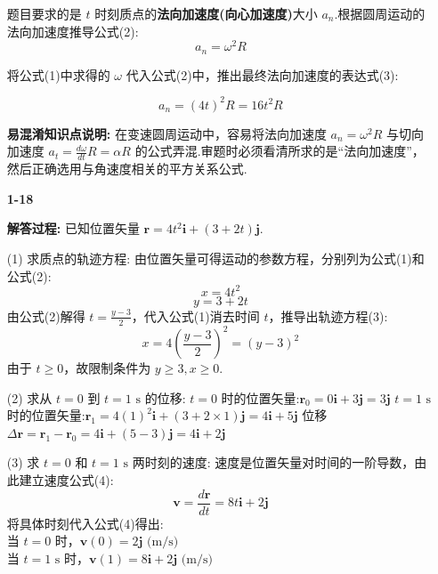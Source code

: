 \begin{enumerate}
题目要求的是 $t$ 时刻质点的\textbf{法向加速度(向心加速度)}大小 $a_n$.根据圆周运动的法向加速度推导公式(2):
\begin{equation}
	a_n = \omega^2 R
\end{equation}

将公式(1)中求得的 $\omega$ 代入公式(2)中，推出最终法向加速度的表达式(3):

\begin{equation}
	a_n = (4t)^2 R = 16t^2 R
\end{equation}

\textbf{易混淆知识点说明:}
在变速圆周运动中，容易将法向加速度 $a_n = \omega^2 R$ 与切向加速度 $a_t = \frac{d\omega}{dt} R = \alpha R$ 的公式弄混.审题时必须看清所求的是“法向加速度”，然后正确选用与角速度相关的平方关系公式.

\vspace{2em}

\item[\textbf{1-18}]


\textbf{解答过程:}
已知位置矢量 $\mathbf{r} = 4t^2\mathbf{i} + (3 + 2t)\mathbf{j}$.

(1) 求质点的轨迹方程:
由位置矢量可得运动的参数方程，分别列为公式(1)和公式(2):
\begin{equation}
	x = 4t^2
\end{equation}
\begin{equation}
	y = 3 + 2t
\end{equation}
由公式(2)解得 $t = \frac{y-3}{2}$，代入公式(1)消去时间 $t$，推导出轨迹方程(3):
\begin{equation}
	x = 4\left(\frac{y-3}{2}\right)^2 = (y-3)^2
\end{equation}
由于 $t \ge 0$，故限制条件为 $y \ge 3, x \ge 0$.

(2) 求从 $t = 0$ 到 $t = 1\text{ s}$ 的位移:
$t = 0$ 时的位置矢量:$\mathbf{r}_0 = 0\mathbf{i} + 3\mathbf{j} = 3\mathbf{j}$
$t = 1\text{ s}$ 时的位置矢量:$\mathbf{r}_1 = 4(1)^2\mathbf{i} + (3 + 2\times1)\mathbf{j} = 4\mathbf{i} + 5\mathbf{j}$
位移 $\Delta\mathbf{r} = \mathbf{r}_1 - \mathbf{r}_0 = 4\mathbf{i} + (5 - 3)\mathbf{j} = 4\mathbf{i} + 2\mathbf{j}$

(3) 求 $t = 0$ 和 $t = 1\text{ s}$ 两时刻的速度:
速度是位置矢量对时间的一阶导数，由此建立速度公式(4):
\begin{equation}
	\mathbf{v} = \frac{d\mathbf{r}}{dt} = 8t\mathbf{i} + 2\mathbf{j}
\end{equation}
将具体时刻代入公式(4)得出:\\
当 $t = 0$ 时，$\mathbf{v}(0) = 2\mathbf{j} \text{ (m/s)}$ \\
当 $t = 1\text{ s}$ 时，$\mathbf{v}(1) = 8\mathbf{i} + 2\mathbf{j} \text{ (m/s)}$


\end{enumerate}
